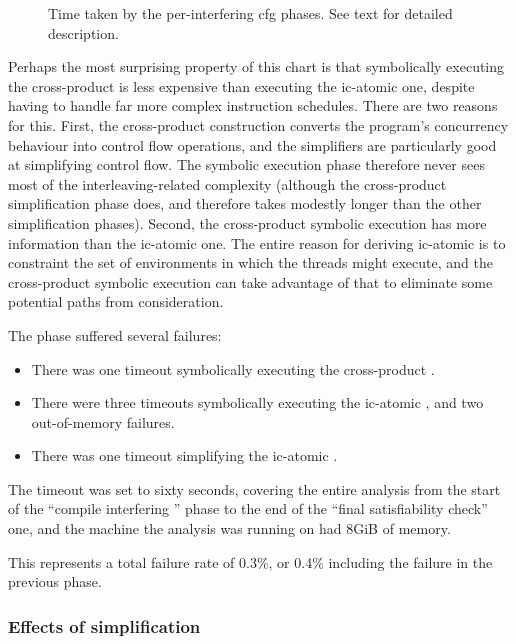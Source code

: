 \begin{figure}
  
  \caption{Time taken by the per-interfering \gls{cfg} phases.  See
    text for detailed description.}
  \label{fig:eval:time_breakdown:interfering}
\end{figure}

Perhaps the most surprising property of this chart is that
symbolically executing the cross-product {\StateMachine} is less
expensive than executing the \gls{ic-atomic} one, despite having to
handle far more complex instruction schedules.  There are two reasons
for this.  First, the cross-product construction converts the
program's concurrency behaviour into control flow operations, and the
{\StateMachine} simplifiers are particularly good at simplifying
control flow.  The symbolic execution phase therefore never sees most
of the interleaving-related complexity (although the cross-product
simplification phase does, and therefore takes modestly longer than
the other simplification phases).  Second, the cross-product symbolic
execution has more information than the \gls{ic-atomic} one.  The
entire reason for deriving \gls{ic-atomic} is to constraint the set of
environments in which the threads might execute, and the cross-product
symbolic execution can take advantage of that to eliminate some
potential paths from consideration.

The phase suffered several failures:

\begin{itemize}
\item There was one timeout symbolically executing the cross-product
  {\StateMachine}.
\item There were three timeouts symbolically executing the \gls{ic-atomic}
  {\StateMachine}, and two out-of-memory failures.
\item There was one timeout simplifying the \gls{ic-atomic}
  {\StateMachine}.
\end{itemize}

The timeout was set to sixty seconds, covering the entire analysis
from the start of the ``compile interfering {\StateMachine}'' phase to
the end of the ``final satisfiability check'' one, and the machine the
analysis was running on had 8GiB of memory.

This represents a total failure rate of 0.3\%, or 0.4\% including the
failure in the previous phase.  

\subsubsection{Effects of {\StateMachine} simplification}

